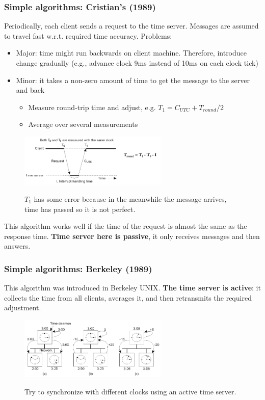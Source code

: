 \documentclass[10pt,a4paper]{article}
\begin{document}
\subsubsection{Simple algorithms: Cristian's (1989)}
Periodically, each client sends a request to the time server. Messages are assumed to travel fast w.r.t. required time accuracy. Problems:
\begin{itemize}
	\item Major: time might run backwards on client machine. Therefore, introduce change gradually (e.g., advance clock 9ms instead of 10ms on each clock tick)
	\item Minor: it takes a non-zero amount of time to get the message to the server and back
	\begin{itemize}
		\item Measure round-trip time and adjust, e.g. $T_1=C_{UTC}+T_{round}/2$
		\item Average over several measurements
	\end{itemize}
\end{itemize}
\begin{figure}[h!]
 \hfill \includegraphics[width=200pt]{images/cristian.png}\hspace*{\fill}
  \label{fig:cristian}
  \caption{$T_1$ has some error because in the meanwhile the message arrives, time has passed so it is not perfect.}
\end{figure}
This algorithm works well if the time of the request is almost the same as the response time. \textbf{Time server here is passive}, it only receives messages and then answers.
\subsubsection{Simple algorithms: Berkeley (1989)}
This algorithm was introduced in Berkeley UNIX. \textbf{The time server is active}: it collects the time from all clients, averages it, and then retransmits the required adjustment.
\begin{figure}[h!]
 \hfill \includegraphics[width=200pt]{images/berkeley.png}\hspace*{\fill}
  \label{fig:berkeley}
  \caption{Try to synchronize with different clocks using an active time server.}
\end{figure}
\end{document}
